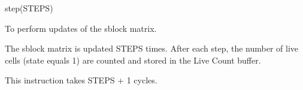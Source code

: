 

\format

step(STEPS)

\purpose

To perform updates of the sblock matrix.

\description

The sblock matrix is updated STEPS times.
After each step, the number of live cells (state equals 1) are counted and stored in the Live Count buffer.

\notes

This instruction takes STEPS + 1 cycles.
